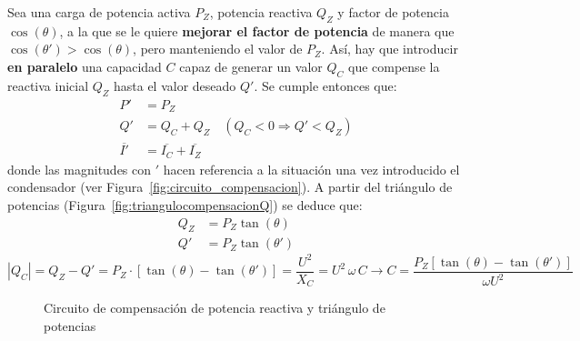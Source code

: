 Sea una carga de potencia activa $P_Z$, potencia reactiva $Q_Z$ y
factor de potencia $\cos(\theta)$, a la que se le quiere
\textbf{mejorar el factor de potencia} de manera que
$\cos (\theta') > \cos (\theta)$, pero manteniendo el valor de
$P_Z$. Así, hay que introducir \textbf{en paralelo} una capacidad $C$
capaz de generar un valor $Q_C$ que compense la reactiva inicial $Q_Z$
hasta el valor deseado $Q'$. Se cumple entonces que:
\begin{align*}
  P' &= P_Z\\
  Q' &= Q_C + Q_Z \quad (Q_C<0\Rightarrow Q' < Q_Z)\\
  \overline{I'} &= \overline{I_C} + \overline{I_Z}
\end{align*}
donde las magnitudes con $'$ hacen referencia a la situación una vez
introducido el condensador (ver
Figura~\ref{fig:circuito_compensacion}). A partir del triángulo de
potencias (Figura~\ref{fig:triangulocompensacionQ}) se deduce que:
\begin{align*}
  Q_Z &= P_Z \tan (\theta)\\
  Q'&= P_Z \tan (\theta')
\end{align*}
\begin{equation}\label{eq:compensacion_Q_mono}
  |Q_C| = Q_Z - Q' = P_Z\cdot \left[\tan (\theta) - \tan (\theta')\right]=\dfrac{U^2}{X_C}={U^2\,\omega\,C}\rightarrow \boxed{C=\frac{P_Z \left[\tan (\theta) - \tan (\theta')\right]}{\omega U^2}}
\end{equation}
	
	
\begin{figure}
  \centering
  \hfil {}
  \caption{Circuito de compensación de potencia reactiva y triángulo
    de potencias}
  \label{fig:circuitocompensacionreactiva}
\end{figure}
	
